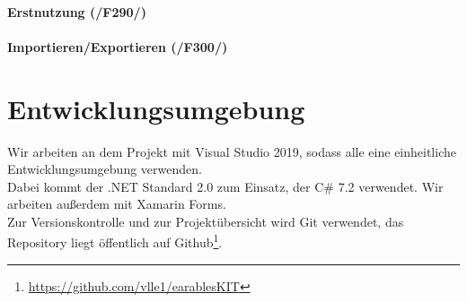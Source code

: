 \documentclass[a4paper,12pt]{article}
\begin{document}
      \paragraph{Erstnutzung (/F290/)}

      \paragraph{Importieren/Exportieren (/F300/)}




\section{Entwicklungsumgebung}
Wir arbeiten an dem Projekt mit Visual Studio 2019, sodass alle eine einheitliche Entwicklungsumgebung verwenden.\\
Dabei kommt der .NET Standard 2.0 zum Einsatz, der C\# 7.2 verwendet. Wir arbeiten außerdem mit Xamarin Forms.\\
Zur Versionskontrolle und zur Projektübersicht wird Git verwendet, das Repository liegt öffentlich auf Github\footnote{\url{https://github.com/vlle1/earablesKIT}}.
\clearpage
\printglossaries
{}
\end{document}
